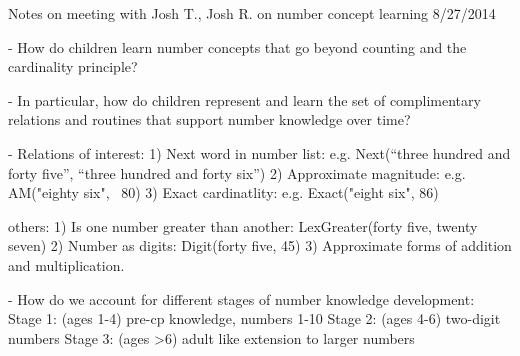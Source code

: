 Notes on meeting with Josh T., Josh R. on number concept learning
8/27/2014

- How do children learn number concepts that go beyond counting and
the cardinality principle?  

- In particular, how do children represent and learn the set of
complimentary relations and routines that support number knowledge
over time? 

- Relations of interest: 
1) Next word in number list: e.g. Next(``three hundred and forty five'', ``three hundred and forty six'')
2) Approximate magnitude: e.g. AM("eighty six", ~80)
3) Exact cardinatlity: e.g. Exact("eight six", 86)


others: 
1) Is one number greater than another: LexGreater(forty five, twenty seven)
2) Number as digits: Digit(forty five, 45)
3) Approximate forms of addition and multiplication. 

- How do we account for different stages of number knowledge development: 
Stage 1: (ages 1-4) pre-cp knowledge, numbers 1-10
Stage 2: (ages 4-6) two-digit numbers
Stage 3: (ages >6) adult like extension to larger numbers




